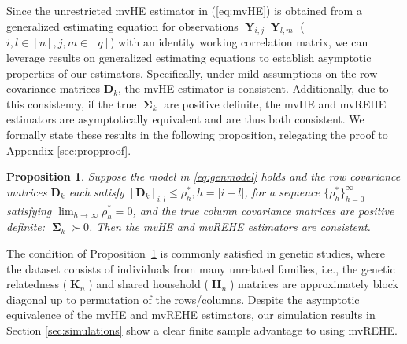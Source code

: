 \documentclass[12pt]{article}
\newtheorem{prop}{Proposition}
\DeclareMathOperator{\Y}{\mathbf{Y}}
\DeclareMathOperator{\K}{\mathbf{K}}
\DeclareMathOperator{\Hn}{\mathbf{H}}
\DeclareMathOperator{\bSigma}{\mathbf{\Sigma}}
\begin{document}

Since the unrestricted mvHE estimator in (\ref{eq:mvHE}) is obtained from a generalized estimating equation for observations $\Y_{i,j}\Y_{l,m}$ ($i,l \in [n], j,m \in [q]$) with an identity working correlation matrix, we can leverage results on generalized estimating equations \parencite{xie2003asymptotics} to establish asymptotic properties of our estimators. Specifically, under mild assumptions on the row covariance matrices $\mathbf{D}_k$, the mvHE estimator is consistent. Additionally, due to this consistency, if the true $\bSigma_k$ are positive definite, the mvHE and mvREHE estimators are asymptotically equivalent and are thus both consistent. We formally state these results in the following proposition, relegating the proof to Appendix \ref{sec:propproof}.
\begin{prop}
Suppose the model in \eqref{eq:genmodel} holds and the row covariance matrices $\mathbf{D}_k$ each satisfy $[\mathbf{D}_k]_{i, l} \leq \rho_h^*, h = |i - l|$, for a sequence $\{\rho_h^*\}_{h = 0}^\infty$ satisfying $\lim_{h \to \infty} \rho_h^* = 0$, and the true column covariance matrices are positive definite: $\bSigma_k \succ 0$. Then the mvHE and mvREHE estimators are consistent. \label{prop:consistency}
\end{prop}
The condition of Proposition~\ref{prop:consistency} is commonly satisfied in genetic studies, where the dataset consists of individuals from many unrelated families, i.e., the genetic relatedness ($\K_n$) and shared household ($\Hn_n$) matrices are approximately block diagonal up to permutation of the rows/columns. Despite the asymptotic equivalence of the mvHE and mvREHE estimators, our simulation results in Section \ref{sec:simulations} show a clear finite sample advantage to using mvREHE. 
\end{document}
